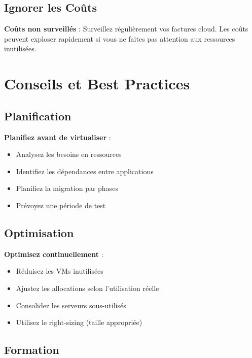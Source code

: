 \documentclass[11pt,a4paper]{article}
\begin{document}
\subsection{Ignorer les Coûts}

\begin{dangerbox}
\textbf{Coûts non surveillés} : Surveillez régulièrement vos factures cloud. Les coûts peuvent exploser rapidement si vous ne faites pas attention aux ressources inutilisées.
\end{dangerbox}

\section{Conseils et Best Practices}

\subsection{Planification}

\begin{tipbox}
\textbf{Planifiez avant de virtualiser} :
\begin{itemize}
    \item Analysez les besoins en ressources
    \item Identifiez les dépendances entre applications
    \item Planifiez la migration par phases
    \item Prévoyez une période de test
\end{itemize}
\end{tipbox}

\subsection{Optimisation}

\begin{tipbox}
\textbf{Optimisez continuellement} :
\begin{itemize}
    \item Réduisez les VMs inutilisées
    \item Ajustez les allocations selon l'utilisation réelle
    \item Consolidez les serveurs sous-utilisés
    \item Utilisez le right-sizing (taille appropriée)
\end{itemize}
\end{tipbox}

\subsection{Formation}
\end{document}
